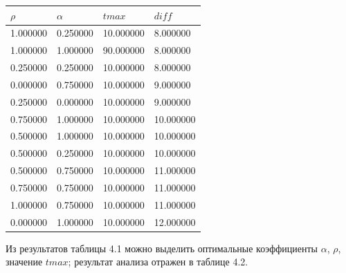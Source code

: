 \documentclass[12pt]{report}
\begin{document}
\begin{center}
	
	\begin{table}[h!]
		\begin{center}
			\begin{tabular}{|llll|}
				\hline
				\multicolumn{1}{|l|}{$\rho$}      & \multicolumn{1}{l|}{$\alpha$} & \multicolumn{1}{l|}{$tmax$} & $diff$      \\ \hline
				\multicolumn{1}{|c}{1.000000} & 0.250000                   & 10.000000                 & 8.000000  \\
				1.000000                      & 1.000000                   & 90.000000                 & 8.000000  \\
				0.250000                      & 0.250000                   & 10.000000                 & 8.000000  \\
				0.000000                      & 0.750000                   & 10.000000                 & 9.000000  \\
				0.250000                      & 0.000000                   & 10.000000                 & 9.000000  \\
				0.750000                      & 1.000000                   & 10.000000                 & 10.000000 \\
				0.500000                      & 1.000000                   & 10.000000                 & 10.000000 \\
				0.500000                      & 0.250000                   & 10.000000                 & 10.000000 \\
				0.500000                      & 0.750000                   & 10.000000                 & 11.000000 \\
				0.750000                      & 0.750000                   & 10.000000                 & 11.000000 \\
				1.000000                      & 0.750000                   & 10.000000                 & 11.000000 \\
				0.000000                      & 1.000000                   & 10.000000                 & 12.000000 \\ \hline
			\end{tabular}
		\end{center}
	\end{table}
	
\end{center}

\clearpage
\newpage

	Из результатов таблицы 4.1 можно выделить оптимальные коэффициенты $\alpha$, $\rho$, значение $tmax$; результат анализа отражен в таблице 4.2.
\end{document}
